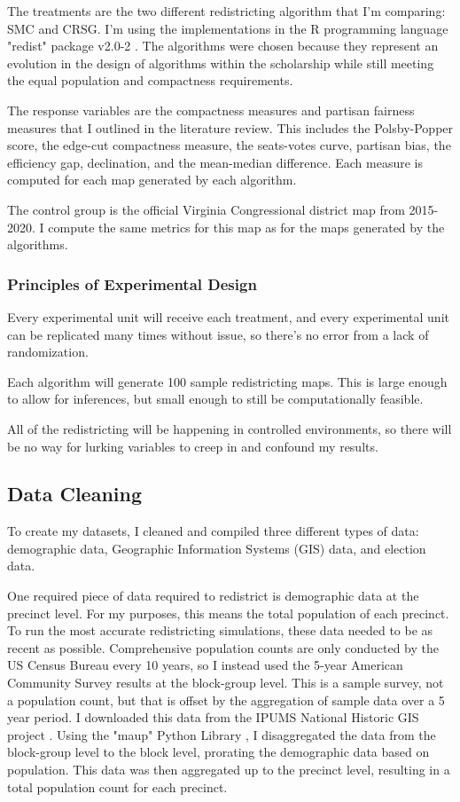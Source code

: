 The treatments  are the two different redistricting algorithm that I'm comparing: SMC and CRSG. I'm using the implementations in the R programming language "redist" package v2.0-2 \parencite{fifield2020d}. The algorithms were chosen because they represent an evolution in the design of algorithms within the scholarship while still meeting the equal population and compactness requirements.

The response variables are the compactness measures and partisan fairness measures that I outlined in the literature review. This includes the Polsby-Popper score, the edge-cut compactness measure, the seats-votes curve, partisan bias, the efficiency gap, declination, and the mean-median difference. Each measure is computed for each map generated by each algorithm.

The control group is the official Virginia Congressional district map from 2015-2020. I compute the same metrics for this map as for the maps generated by the algorithms.

\subsubsection{Principles of Experimental Design}

Every experimental unit will receive each treatment, and every experimental unit can be replicated many times without issue, so there's no error from a lack of randomization. 

Each algorithm will generate 100 sample redistricting maps. This is large enough to allow for inferences, but small enough to still be computationally feasible. 

All of the redistricting will be happening in controlled environments, so there will be no way for lurking variables to creep in and confound my results. 

\subsection{Data Cleaning}

To create my datasets, I cleaned and compiled three different types of data: demographic data, Geographic Information Systems (GIS) data, and election data.

One required piece of data required to redistrict is demographic data at the precinct level. For my purposes, this means the total population of each precinct. To run the most accurate redistricting simulations, these data needed to be as recent as possible. Comprehensive population counts are only conducted by the US Census Bureau every 10 years, so I instead used the 5-year American Community Survey results at the block-group level. This is a sample survey, not a population count, but that is offset by the aggregation of sample data over a 5 year period. I downloaded this data from the IPUMS National Historic GIS project \parencite{mansonsteven2020}. Using the "maup" Python Library \parencite{hully2020}, I disaggregated the data from the block-group level to the block level, prorating the demographic data based on population. This data was then aggregated up to the precinct level, resulting in a total population count for each precinct.

